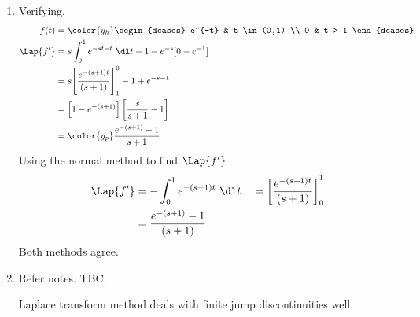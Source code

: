 \begin{enumerate}
\begin{enumerate}
              \item Verifying,
                    \begin{align}
                        f(t)       & = \color{y_h}\begin{dcases}
                                                      e^{-t} & t \in (0,1) \\
                                                      0      & t > 1
                                                  \end{dcases}             \\
                        \Lap\{f'\} & = s \int_{0}^{1}e^{-st - t}\ \dl t - 1
                        - e^{-s}[0 - e^{-1}]                                       \\
                                   & = s\Bigg[ \frac{e^{-(s+1)t}}{(s+1)}\Bigg]_1^0
                        - 1 + e^{-s-1}                                             \\
                                   & = \Big[1 - e^{-(s+1)}\Big]\left[
                        \frac{s}{s+1} - 1 \right]                                  \\
                                   & = \color{y_p} \frac{e^{-(s+1)} - 1}{s+1}
                    \end{align}
                    Using the normal method to find $ \Lap\{f'\} $
                    \begin{align}
                        \Lap\{f'\} & = -\int_{0}^{1} e^{-(s+1)t}\ \dl t             &
                                   & = \left[ \frac{e^{-(s+1)t}}{(s+1)} \right]_0^1   \\
                                   & = \frac{e^{-(s+1)} - 1}{(s+1)}
                    \end{align}
                    Both methods agree.
              \item Refer notes. TBC. \par
              Laplace transform method deals with finite jump discontinuities well. 
          \end{enumerate}
\end{enumerate}